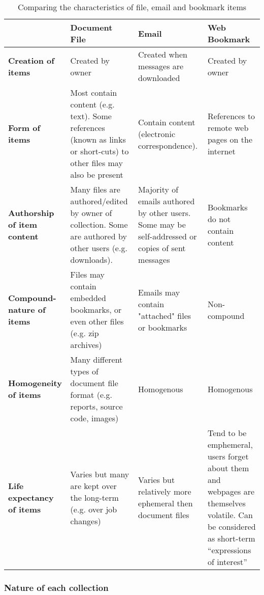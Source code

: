\begin{table}[h]
\begin{center}
\begin{footnotesize}
\begin{tabular}{|p{2.5cm}|p{3.5cm}|p{3.5cm}|p{3.5cm}|}
\hline
 & {\bf Document File} & {\bf Email} & {\bf Web Bookmark} \\
\hline \hline
{\bf Creation of items} & Created by owner & Created when messages are downloaded & Created by owner \\
\hline
{\bf Form of items} & Most contain content (e.g. text).  Some references (known as links or short-cuts)  to other  files may also be  present & Contain content (electronic correspondence).  & References to remote web pages on the internet \\
\hline
{\bf Authorship of item content} & Many files are authored/edited by owner of collection.  Some are authored by other users (e.g. downloads).  & Majority of emails authored by other users. Some may be self-addressed or copies of sent messages & Bookmarks do not contain content \\
\hline
{\bf Compound-nature of items} & Files may contain embedded bookmarks, or even other files (e.g. zip archives) & Emails may contain "attached" files or bookmarks & Non-compound \\
\hline
{\bf Homogeneity of items} & Many different types of document file format (e.g. reports, source code, images) & Homogenous & Homogenous \\
\hline
{\bf Life expectancy of items} & Varies but many are kept over the long-term (e.g. over job changes) & Varies but relatively more ephemeral then document files & Tend to be emphemeral, users forget about them and webpages are themselves volatile. Can be considered as short-term ``expressions of interest'' \\
\hline
\end{tabular}  
\end{footnotesize}
\caption{Comparing the characteristics of file, email and bookmark items}
\label{table:chapter3_item_characteristics}
\end{center}
\end{table}
\normalsize




\newpage
\subsubsection{Nature of each collection}

